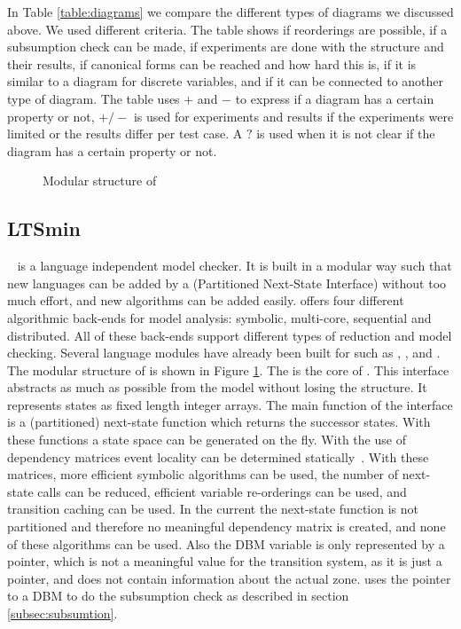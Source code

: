 In Table \ref{table:diagrams} we compare the different types of diagrams we discussed above. We used different criteria. The table shows if reorderings are possible, if a subsumption check can be made, if experiments are done with the structure and their results, if canonical forms can be reached and how hard this is, if it is similar to a diagram for discrete variables, and if it can be connected to another type of diagram. The table uses $+$ and $-$ to express if a diagram has a certain property or not, $+/-$ is used for experiments and results if the experiments were limited or the results differ per test case. A $?$ is used when it is not clear if the diagram has a certain property or not. 

\begin{figure}[h] 

\caption{Modular structure of \ltsmin{}}
\label{fig:pins_modern}
\end{figure}

\subsection{LTSmin}
\ltsmin{}~\cite{eemcs18152,ltsmin-mc:nmf2011} is a language independent model checker. It is built in a modular way such that new languages can be added by a \pins{} (Partitioned Next-State Interface) without too much effort, and new algorithms can be added easily. \ltsmin{} offers four different algorithmic back-ends for model analysis: symbolic, multi-core, sequential and distributed. All of these back-ends support different types of reduction and model checking. Several language modules have already been built for \ltsmin{} such as \mcrl{}, \promela{}, \dve{} and \uppaal{}. The modular structure of \ltsmin{} is shown in Figure \ref{fig:pins_modern}. The \pins{} is the core of \ltsmin{}. This interface abstracts as much as possible from the model without losing the structure. It represents states as fixed length integer arrays. The main function of the interface is a (partitioned) next-state function which returns the successor states. With these functions a state space can be generated on the fly. With the use of dependency matrices event locality can be determined statically~\cite{rwcmatrices}. With these matrices, more efficient symbolic algorithms can be used, the number of next-state calls can be reduced, efficient variable re-orderings can be used, and transition caching can be used. In the current \uppaal{} \pins{} the next-state function is not partitioned and therefore no meaningful dependency matrix is created, and none of these algorithms can be used. Also the DBM variable is only represented by a pointer, which is not a meaningful value for the transition system, as it is just a pointer, and does not contain information about the actual zone. \ltsmin{} uses the pointer to a DBM to do the subsumption check as described in section \ref{subsec:subsumtion}.

